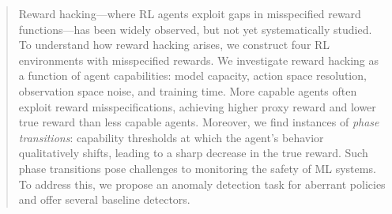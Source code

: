\begin{abstract}
    Reward hacking---where RL agents exploit gaps in misspecified reward functions---has been widely observed, but not yet systematically studied. To understand how reward hacking arises, we construct four RL environments with misspecified rewards. %
    We investigate reward hacking as a function of agent capabilities: model capacity, action space resolution, observation space noise, and training time. More capable agents often exploit reward misspecifications, achieving higher proxy reward and lower true reward than less capable agents. Moreover, we find instances of \emph{phase transitions}: capability thresholds at which the agent's behavior qualitatively shifts, leading to a sharp decrease in the true reward. %
    Such phase transitions pose challenges to monitoring the safety of ML systems. To %
    address this, we propose an anomaly detection task for aberrant policies and offer several baseline detectors.
\end{abstract}